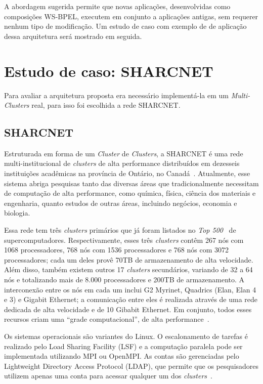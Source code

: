 \documentclass[12pt]{report} %
\begin{document}
	A abordagem sugerida permite que novas aplicações, desenvolvidas como composições WS-BPEL, executem em conjunto a aplicações antigas, sem requerer nenhum tipo de modificação.
	Um estudo de caso com exemplo de de aplicação dessa arquitetura será mostrado em seguida.

    \section{Estudo de caso: SHARCNET}
    \label{sec:EstudoDeCasoSHARCNET}
	Para avaliar a arquitetura proposta era necessário implementá-la em um \textit{Multi-Clusters} real, para isso foi escolhida a rede SHARCNET.

	\subsection{SHARCNET}
	\label{subsec:SHARCNET}
	    Estruturada em forma de um \textit{Cluster} de \textit{Clusters}, a SHARCNET é uma rede multi-institucional de \textit{clusters} de alta performance distribuídos em dezesseis instituições acadêmicas na província de Ontário, no Canadá~\cite{Bauer07}.
	    Atualmente, esse sistema abriga pesquisas tanto das diversas áreas que tradicionalmente necessitam de computação de alta performance, como química, física, ciência dos materiais e engenharia, quanto estudos de outras áreas, incluindo negócios, economia e biologia.
	    
	    Essa rede tem três \textit{clusters} primários que já foram listados no \textit{Top 500}~\cite{top500:website} de supercomputadores.
	    Respectivamente, esses três \textit{clusters} contêm 267 nós com 1068 processadores, 768 nós com 1536 processadores e 768 nós com 3072 processadores;
	    cada um deles provê 70TB de armazenamento de alta velocidade.
	    Além disso, também existem outros 17 \textit{clusters} secundários, variando de 32 a 64 nós e totalizando mais de 8.000 processadores e 200TB de armazenamento. 
	    A interconexão entre os nós em cada um inclui G2 Myrinet, Quadrics (Elan, Elan 4 e 3) e Gigabit Ethernet;
	    a comunicação entre eles é realizada através de uma rede dedicada de alta velocidade e de 10 Gibabit Ethernet.
	    Em conjunto, todos esses recursos criam uma ``grade computacional'', de alta performance~\cite{bauerHPC}.

	    Os sistemas operacionais são variantes do Linux.
	    O escalonamento de tarefas é realizado pelo Load Sharing Facility (LSF) e a computação paralela pode ser implementada utilizando MPI ou OpenMPI.
	    As contas são gerenciadas pelo Lightweight Directory Access Protocol (LDAP), que permite que os pesquisadores utilizem apenas uma conta para acessar qualquer um dos \textit{clusters}~\cite{bauerHPC}.
\end{document}

